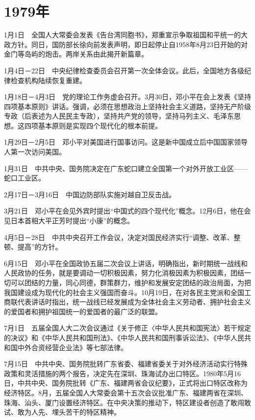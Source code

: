 \documentclass[10pt,a4paper,twocolumn]{book}
\begin{document}
\section{1979年}

1月1日　全国人大常委会发表《告台湾同胞书》，郑重宣示争取祖国和平统一的大政方针。同日，国防部长徐向前发表声明，即日起停止自1958年8月23日开始的对金门等岛屿的炮击。两岸关系由此揭开新篇章。

1月4日－22日　中央纪律检查委员会召开第一次全体会议。此后，全国地方各级纪律检查机构陆续恢复重建。

1月18日－4月3日　党的理论工作务虚会召开。3月30日，邓小平在会上发表《坚持四项基本原则》讲话。强调，必须在思想政治上坚持社会主义道路，坚持无产阶级专政（后表述为人民民主专政），坚持共产党的领导，坚持马列主义、毛泽东思想。这四项基本原则是实现四个现代化的根本前提。

1月29日－2月5日　邓小平对美国进行国事访问。这是新中国成立后中国国家领导人第一次访问美国。

1月31日　中共中央、国务院决定在广东蛇口建立全国第一个对外开放工业区——蛇口工业区。

2月17日－3月16日　中国边防部队实施对越自卫反击战。

3月21日　邓小平在会见外宾时提出“中国式的四个现代化”概念。12月6日，他在会见日本首相大平正芳时提出“小康”的概念。

4月5日－28日　中共中央召开工作会议，决定对国民经济实行“调整、改革、整顿、提高”的方针。

6月15日　邓小平在全国政协五届二次会议上讲话，明确指出，新时期统一战线和人民政协的任务，就是要调动一切积极因素，努力化消极因素为积极因素，团结一切可以团结的力量，同心同德，群策群力，维护和发展安定团结的政治局面，为把我国建设成为现代化的社会主义强国而奋斗。10月19日，在对各民主党派和全国工商联代表讲话时指出，统一战线已经发展成为全体社会主义劳动者、拥护社会主义的爱国者和拥护祖国统一的爱国者的最广泛的联盟。

7月1日　五届全国人大二次会议通过《关于修正〈中华人民共和国宪法〉若干规定的决议》和《中华人民共和国刑法》、《中华人民共和国刑事诉讼法》、《中华人民共和国中外合资经营企业法》等七部法律。

7月15日　中共中央、国务院批转广东省委、福建省委关于对外经济活动实行特殊政策和灵活措施的两个报告，决定先在深圳、珠海试办出口特区。1980年5月16日，中共中央、国务院批转《广东、福建两省会议纪要》，正式将出口特区改称为经济特区。8月，五届全国人大常委会第十五次会议批准广东、福建两省在深圳、珠海、汕头、厦门设置经济特区。在中央决策的推动下，特区建设者创造了敢闯敢试、敢为人先、埋头苦干的特区精神。
\end{document}
